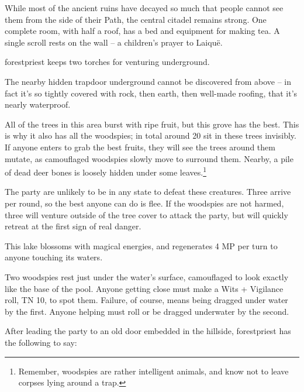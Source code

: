 \begin{multicols}{2}

\label{lost_citadel}
While most of the ancient ruins have decayed so much that people cannot see them from the side of their Path, the central citadel remains strong.
One complete room,  with half a roof, has a bed and equipment for making tea.
A single scroll rests on the wall -- a children's prayer to Laiqu\"{e}.

\Gls{forestpriest} keeps two torches for venturing underground.

The nearby hidden trapdoor underground cannot be discovered from above -- in fact it's so tightly covered with rock, then earth, then well-made roofing, that it's nearly waterproof.


All of the trees in this area burst with ripe fruit, but this grove has the best.
This is why it also has all the woodspies; in total around 20 sit in these trees invisibly.
If anyone enters to grab the best fruits, they will see the trees around them mutate, as camouflaged woodspies slowly move to surround them.
Nearby, a pile of dead deer bones is loosely hidden under some leaves.\footnote{Remember, woodspies are rather intelligent animals, and know not to leave corpses lying around a trap.}

The party are unlikely to be in any state to defeat these creatures.  Three arrive per round, so the best anyone can do is flee.  If the woodspies are not harmed, three will venture outside of the tree cover to attack the party, but will quickly retreat at the first sign of real danger.



This lake blossoms with magical energies, and regenerates 4 MP per turn to anyone touching its waters.

Two woodspies rest just under the water's surface, camouflaged to look exactly like the base of the pool.
Anyone getting close must make a Wits + Vigilance roll, TN 10, to spot them.
Failure, of course, means being dragged under water by the first.
Anyone helping must roll or be dragged underwater by the second.


After leading the party to an old door embedded in the hillside, \gls{forestpriest} has the following to say:


\end{multicols}
